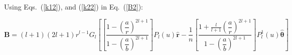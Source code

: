 Using Eqs.~(\ref{k12}), and (\ref{k22}) in Eq.~(\ref{B2}):




$$\bm B= (l+1)(2l+1)r^{l-1}G_l\left[\left[\frac{1-\left(\dfrac{a}{r}\right)^{2l+1}}{1-\left(\dfrac{a}{b}\right)^{2l+1}}\right] P_l(u) \bm{\hat{r}} -\frac{1}{n}\left[\frac{1+\frac{l}{l+1}\left(\dfrac{a}{r}\right)^{2l+1}}{1-\left(\dfrac{a}{b}\right)^{2l+1}}\right] P_l^1(u) \bm{\hat{\theta}}\right]$$



